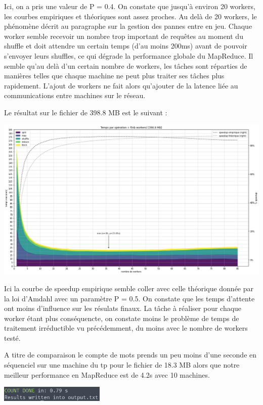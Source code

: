 \documentclass[11pt,a4paper]{article}
\begin{document}
Ici, on a pris une valeur de P = 0.4. On constate que jusqu'à environ 20 workers, les courbes empiriques et théoriques sont assez proches. Au delà de 20 workers, le phénomène décrit au paragraphe sur la gestion des pannes entre en jeu. Chaque worker semble recevoir un nombre trop important de requêtes au moment du shuffle et doit attendre un certain temps (d'au moins 200ms) avant de pouvoir s'envoyer leurs shuffles, ce qui dégrade la performance globale du MapReduce. Il semble qu'au delà d'un certain nombre de workers, les tâches sont réparties de manières telles que chaque machine ne peut plus traiter ses tâches plus rapidement. L'ajout de workers ne fait alors qu'ajouter de la latence liée au communications entre machines sur le réseau.

Le résultat sur le fichier de 398.8 MB est le suivant :

\includegraphics[width=\columnwidth]{graph2.png}

Ici la courbe de speedup empirique semble coller avec celle théorique donnée par la loi d'Amdahl avec un paramètre P = 0.5. On constate que les temps d'attente ont moins d'influence sur les résulats finaux. La tâche à réaliser pour chaque worker étant plus conséquencte, on constate moins le problème de temps de traitement irréductible vu précédemment, du moins avec le nombre de workers testé.

A titre de comparaison le compte de mots prends un peu moins d'une seconde en séquenciel sur une machine du tp pour le fichier de 18.3 MB alors que notre meilleur performance en MapReduce est de 4.2s avec 10 machines.

\includegraphics[width=5cm]{screenshot_seq1.png}
\end{document}
